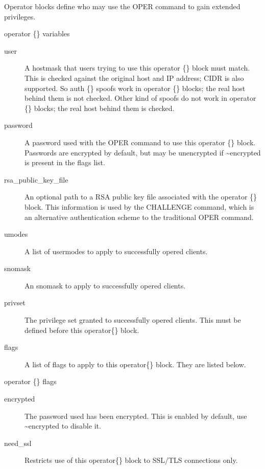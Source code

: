 	Operator blocks define who may use the OPER command to gain extended privileges.


{\sc operator \{\} variables}
\nopagebreak

\noindent
\begin{description}
\item[{user}]
	A hostmask that users trying to use this operator \{\} block must
	match. This is checked against the original host and IP	address; CIDR
	is also supported. So auth \{\} spoofs work in operator \{\} blocks;
	the real host behind them is not checked. Other kind of spoofs do not
	work in operator \{\} blocks; the real host behind them is checked.

\item[{password}]
	A password used with the OPER command to use this operator \{\} block.
	Passwords are encrypted by default, but may be unencrypted if
	\textasciitilde{}encrypted is present in the flags list.

\item[{rsa\_public\_key\_file}]
	An optional path to a RSA public key file associated with the
	operator \{\} block. This information is used by the CHALLENGE command,
	which is an alternative authentication scheme to the traditional OPER
	command.

\item[{umodes}]
	A list of usermodes to apply to successfully opered clients.

\item[{snomask}]
	An snomask to apply to successfully opered clients.

\item[{privset}]
	The privilege set granted to successfully opered clients. This must be
	defined before this operator\{\} block.

\item[{flags}] A list of flags to apply to this operator\{\} block. They are listed below.
\end{description}

{\sc operator \{\} flags}
\nopagebreak

\noindent
\begin{description}
\item[{encrypted}]
	The password used has been encrypted. This is enabled by default, use
	\textasciitilde{}encrypted to disable it.

\item[{need\_ssl}]
	Restricts use of this operator\{\} block to SSL/TLS connections only.
\end{description}


